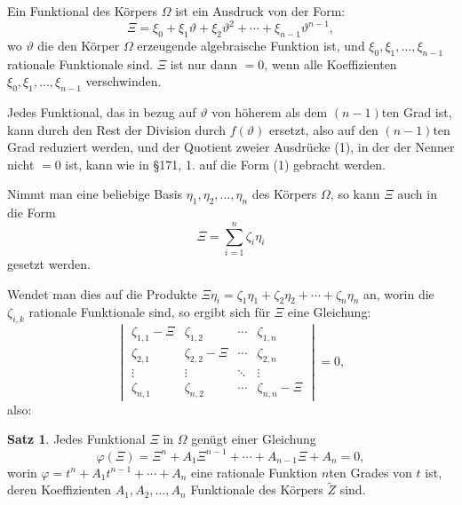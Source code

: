 \documentclass[12pt,a4paper]{article}
\theoremstyle{definition}
\newtheorem{satz}{Satz}[section]
\begin{document}
Ein Funktional des Körpers $\Omega$ ist ein Ausdruck von der Form:
\begin{equation}
\Xi = \xi_0 + \xi_1\vartheta + \xi_2\vartheta^2 + \cdots + \xi_{n-1}\vartheta^{n-1},
\end{equation}
wo $\vartheta$ die den Körper $\Omega$ erzeugende algebraische Funktion ist, und $\xi_0, \xi_1, \ldots, \xi_{n-1}$ rationale Funktionale sind. $\Xi$ ist nur dann $= 0$, wenn alle Koeffizienten $\xi_0, \xi_1, \ldots, \xi_{n-1}$ verschwinden.

Jedes Funktional, das in bezug auf $\vartheta$ von höherem als dem $(n-1)$ten Grad ist, kann durch den Rest der Division durch $f(\vartheta)$ ersetzt, also auf den $(n-1)$ten Grad reduziert werden, und der Quotient zweier Ausdrücke (1), in der der Nenner nicht $= 0$ ist, kann wie in \S 171, 1. auf die Form (1) gebracht werden.

Nimmt man eine beliebige Basis $\eta_1, \eta_2, \ldots, \eta_n$ des Körpers $\Omega$, so kann $\Xi$ auch in die Form
\begin{equation}
\Xi = \sum_{i=1}^n \zeta_i \eta_i
\end{equation}
gesetzt werden.

Wendet man dies auf die Produkte $\Xi\eta_i = \zeta_1\eta_1 + \zeta_2\eta_2 + \cdots + \zeta_n\eta_n$ an, worin die $\zeta_{i,k}$ rationale Funktionale sind, so ergibt sich für $\Xi$ eine Gleichung:
\begin{equation}
\begin{vmatrix}
\zeta_{1,1} - \Xi & \zeta_{1,2} & \cdots & \zeta_{1,n} \\
\zeta_{2,1} & \zeta_{2,2} - \Xi & \cdots & \zeta_{2,n} \\
\vdots & \vdots & \ddots & \vdots \\
\zeta_{n,1} & \zeta_{n,2} & \cdots & \zeta_{n,n} - \Xi
\end{vmatrix} = 0,
\end{equation}
also:

\begin{satz}
Jedes Funktional $\Xi$ in $\Omega$ genügt einer Gleichung
\begin{equation}
\varphi(\Xi) = \Xi^n + A_1\Xi^{n-1} + \cdots + A_{n-1}\Xi + A_n = 0,
\end{equation}
worin $\varphi = t^n + A_1t^{n-1} + \cdots + A_n$ eine rationale Funktion $n$ten Grades von $t$ ist, deren Koeffizienten $A_1, A_2, \ldots, A_n$ Funktionale des Körpers $\tilde{Z}$ sind.
\end{satz}
\end{document}
